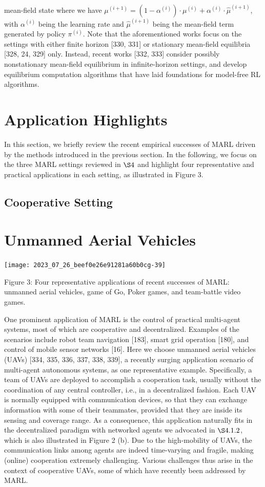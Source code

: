 \documentclass[10pt]{article}
\begin{document}
mean-field state where we have $\mu^{(i+1)}=\left(1-\alpha^{(i)}\right) \cdot \mu^{(i)}+\alpha^{(i)} \cdot \hat{\mu}^{(i+1)}$, with $\alpha^{(i)}$ being the learning rate and $\hat{\mu}^{(i+1)}$ being the mean-field term generated by policy $\pi^{(i)}$. Note that the aforementioned works focus on the settings with either finite horizon [330, 331] or stationary mean-field equilibria [328, 24, 329] only. Instead, recent works [332, 333] consider possibly nonstationary mean-field equilibrium in infinite-horizon settings, and develop equilibrium computation algorithms that have laid foundations for model-free RL algorithms.

\section{Application Highlights}
In this section, we briefly review the recent empirical successes of MARL driven by the methods introduced in the previous section. In the following, we focus on the three MARL settings reviewed in $\S 4$ and highlight four representative and practical applications in each setting, as illustrated in Figure 3.

\subsection{Cooperative Setting}
\section{Unmanned Aerial Vehicles}
\begin{center}
\texttt{[image: 2023\_07\_26\_beef0e26e91281a60b0cg-39]}
\end{center}

Figure 3: Four representative applications of recent successes of MARL: unmanned aerial vehicles, game of Go, Poker games, and team-battle video games.

One prominent application of MARL is the control of practical multi-agent systems, most of which are cooperative and decentralized. Examples of the scenarios include robot team navigation [183], smart grid operation [180], and control of mobile sensor networks [16]. Here we choose unmanned aerial vehicles (UAVs) [334, 335, 336, 337, 338, 339], a recently surging application scenario of multi-agent autonomous systems, as one representative example. Specifically, a team of UAVs are deployed to accomplish a cooperation task, usually without the coordination of any central controller, i.e., in a decentralized fashion. Each UAV is normally equipped with communication devices, so that they can exchange information with some of their teammates, provided that they are inside its sensing and coverage range. As a consequence, this application naturally fits in the decentralized paradigm with networked agents we advocated in $\S 4.1 .2$, which is also illustrated in Figure 2 (b). Due to the high-mobility of UAVs, the communication links among agents are indeed time-varying and fragile, making (online) cooperation extremely challenging. Various challenges thus arise in the context of cooperative UAVs, some of which have recently been addressed by MARL.
\end{document}
